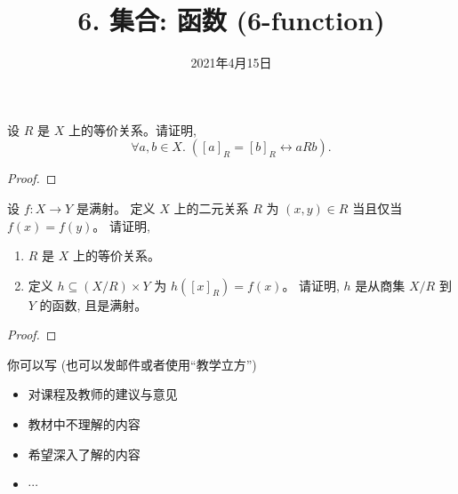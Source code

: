 \documentclass[a4paper, justified]{tufte-handout}
\title{6. 集合: 函数 (6-function)}
\date{2021年4月15日}
\begin{document}
\maketitle
\noplagiarism %
\begin{abstract}
\end{abstract}
\beginrequired

\begin{problem}
  设 $R$ 是 $X$ 上的等价关系。请证明,
  \[
    \forall a, b \in X.\; ([a]_{R} = [b]_{R} \leftrightarrow a R b).
  \]
\end{problem}

\begin{proof}
\end{proof}

\begin{problem}[函数与等价关系 \score{7 = 3 + 4} $\star\star\star$]
  设 $f: X \to Y$ 是满射。
  定义 $X$ 上的二元关系 $R$ 为 $(x, y) \in R$ 当且仅当 $f(x) = f(y)$。
  请证明,
  \begin{enumerate}[(1)]
    \item $R$ 是 $X$ 上的等价关系。
    \item 定义 $h \subseteq (X/R) \times Y$ 为 $h([x]_{R}) = f(x)$。
      请证明, $h$ 是从商集 $X/R$ 到 $Y$ 的函数, 且是满射。
  \end{enumerate}
\end{problem}

\begin{proof}
\end{proof}

\begincorrection

\beginfb

你可以写 (也可以发邮件或者使用``教学立方'')
\begin{itemize}
  \item 对课程及教师的建议与意见
  \item 教材中不理解的内容
  \item 希望深入了解的内容
  \item $\cdots$
\end{itemize}
\end{document}
